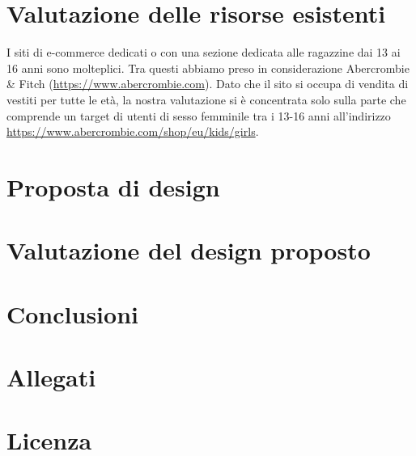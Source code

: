 \documentclass[12pt,a4paper]{report}
\begin{document}
\chapter{Valutazione delle risorse esistenti}
I siti di e-commerce dedicati o con una sezione dedicata alle ragazzine dai 13 ai 16 anni sono molteplici. Tra questi abbiamo preso in considerazione Abercrombie \& Fitch (\href{https://www.abercrombie.com}{https://www.abercrombie.com}). Dato che il sito si occupa di vendita di vestiti per tutte le età, la nostra valutazione si è concentrata solo sulla parte che comprende un target di utenti di sesso femminile tra i 13-16 anni all'indirizzo \href{https://www.abercrombie.com/shop/eu/kids/girls}{https://www.abercrombie.com/shop/eu/kids/girls}.
\chapter{Proposta di design}
\chapter{Valutazione del design proposto}
\chapter{Conclusioni}
\chapter{Allegati}
\chapter{Licenza}
\end{document}
